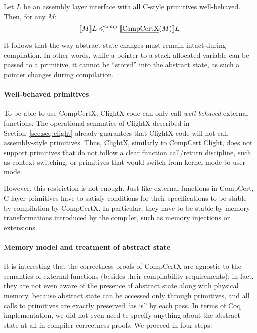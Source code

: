 \begin{theorem}
\label{theorem:compcorect}
Let $L$ be an assembly layer interface with all C-style primitives
well-behaved. Then, for any $M$:
\[
\llbracket M \rrbracket L \leqslant^{\textrm{comp}} \llbracket \textrm{\emph{CompCertX}}(M) \rrbracket L
\]
\end{theorem}




It follows that the way abstract state changes must remain intact during
compilation.
In other words, while a pointer to a stack-allocated
variable can be passed to a primitive, it cannot be ``stored'' into
the abstract state, as such a pointer changes during compilation.

\paragraph{Well-behaved primitives}

To be able to use CompCertX, ClightX code can only call
\emph{well-behaved} external functions. The operational semantics of
ClightX described in Section~\ref{sec:seq:clight} already
guarantees that ClightX code will not call assembly-style primitives. Thus,
ClightX, similarly to CompCert Clight, does not support primitives
that do not follow a clear function call/return discipline, such as
context switching, or primitives that would switch from kernel mode to
user mode.

However, this restriction is not enough. Just like external functions
in CompCert, C layer primitives have to satisfy conditions for their
specifications to be stable by compilation by CompCertX. In
particular, they have to be stable by memory transformations
introduced by the compiler, such as memory injections or extensions.



\paragraph{Memory model and treatment of abstract state}

It is interesting that the correctness proofs  of CompCertX are agnostic to
the semantics of external functions (besides their compilability
requirements): in fact, they are not even aware of the presence of
abstract state along with physical memory, because abstract state can
be accessed only through primitives, and all calls to primitives are
exactly preserved ``as is'' by each pass. In terms of Coq
implementation, we did not even need to specify anything about the
abstract state at all in compiler correctness proofs. We proceed in four steps:

